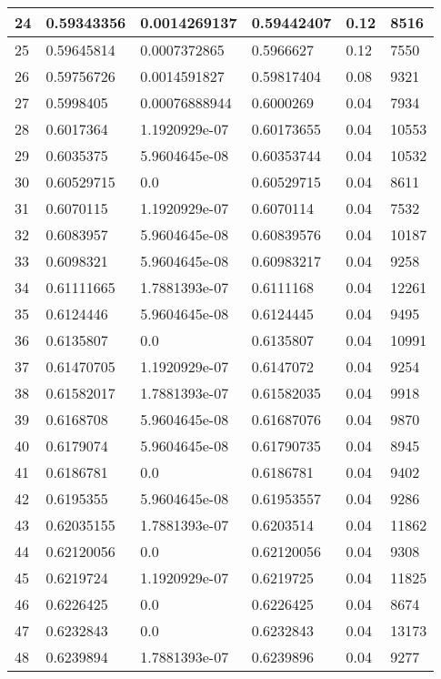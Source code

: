 \begin{longtable}{|l|l|l|l|l|l|}
24 & 0.59343356 & 0.0014269137 & 0.59442407 & 0.12 & 8516 \\ \hline 
25 & 0.59645814 & 0.0007372865 & 0.5966627 & 0.12 & 7550 \\ \hline 
26 & 0.59756726 & 0.0014591827 & 0.59817404 & 0.08 & 9321 \\ \hline 
27 & 0.5998405 & 0.00076888944 & 0.6000269 & 0.04 & 7934 \\ \hline 
28 & 0.6017364 & 1.1920929e-07 & 0.60173655 & 0.04 & 10553 \\ \hline 
29 & 0.6035375 & 5.9604645e-08 & 0.60353744 & 0.04 & 10532 \\ \hline 
30 & 0.60529715 & 0.0 & 0.60529715 & 0.04 & 8611 \\ \hline 
31 & 0.6070115 & 1.1920929e-07 & 0.6070114 & 0.04 & 7532 \\ \hline 
32 & 0.6083957 & 5.9604645e-08 & 0.60839576 & 0.04 & 10187 \\ \hline 
33 & 0.6098321 & 5.9604645e-08 & 0.60983217 & 0.04 & 9258 \\ \hline 
34 & 0.61111665 & 1.7881393e-07 & 0.6111168 & 0.04 & 12261 \\ \hline 
35 & 0.6124446 & 5.9604645e-08 & 0.6124445 & 0.04 & 9495 \\ \hline 
36 & 0.6135807 & 0.0 & 0.6135807 & 0.04 & 10991 \\ \hline 
37 & 0.61470705 & 1.1920929e-07 & 0.6147072 & 0.04 & 9254 \\ \hline 
38 & 0.61582017 & 1.7881393e-07 & 0.61582035 & 0.04 & 9918 \\ \hline 
39 & 0.6168708 & 5.9604645e-08 & 0.61687076 & 0.04 & 9870 \\ \hline 
40 & 0.6179074 & 5.9604645e-08 & 0.61790735 & 0.04 & 8945 \\ \hline 
41 & 0.6186781 & 0.0 & 0.6186781 & 0.04 & 9402 \\ \hline 
42 & 0.6195355 & 5.9604645e-08 & 0.61953557 & 0.04 & 9286 \\ \hline 
43 & 0.62035155 & 1.7881393e-07 & 0.6203514 & 0.04 & 11862 \\ \hline 
44 & 0.62120056 & 0.0 & 0.62120056 & 0.04 & 9308 \\ \hline 
45 & 0.6219724 & 1.1920929e-07 & 0.6219725 & 0.04 & 11825 \\ \hline 
46 & 0.6226425 & 0.0 & 0.6226425 & 0.04 & 8674 \\ \hline 
47 & 0.6232843 & 0.0 & 0.6232843 & 0.04 & 13173 \\ \hline 
48 & 0.6239894 & 1.7881393e-07 & 0.6239896 & 0.04 & 9277 \\ \hline 

\end{longtable}
